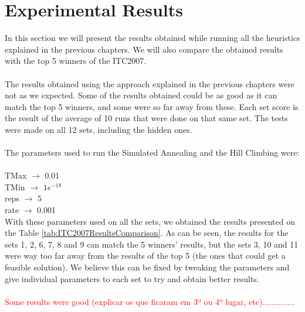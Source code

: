 \chapter{Experimental Results}
\label{sec:ExpResults}

In this section we will present the results obtained while running all the heuristics explained in the previous chapters. We will also compare the obtained results with the top 5 winners of the ITC2007.\\
\\
The results obtained using the approach explained in the previous chapters were not as we expected. Some of the results obtained could be as good as it can match the top 5 winners, and some were so far away from these. Each set score is the result of the average of 10 runs that were done on that same set. The tests were made on all 12 sets, including the hidden ones.\\
\\
The parameters used to run the Simulated Annealing and the Hill Climbing were:\\
\\
TMax $\rightarrow$ 0.01\\
TMin $\rightarrow$ $1e^{-18}$\\
reps $\rightarrow$ 5\\
rate $\rightarrow$ 0.001\\

With these parameters used on all the sets, we obtained the results presented on the Table \ref{tab:ITC2007ResultsComparison}. As can be seen, the results for the sets 1, 2, 6, 7, 8 and 9 can match the 5 winners' results, but the sets 3, 10 and 11 were way too far away from the results of the top 5 (the ones that could get a feasible solution). We believe this can be fixed by tweaking the parameters and give individual parameters to each set to try and obtain better results.\\
\\

\textcolor{red}{Some results were good (explicar os que ficaram em 3º ou 4º lugar, etc)..............}



